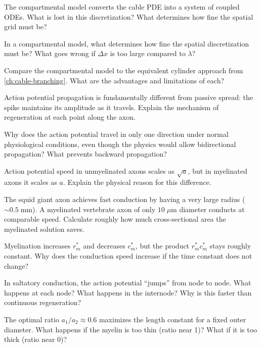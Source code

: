\begin{conceptquestions}
  \item The compartmental model converts the cable PDE into a system of coupled ODEs. What is lost in this discretization? What determines how fine the spatial grid must be?

  \item In a compartmental model, what determines how fine the spatial discretization must be? What goes wrong if $\Delta x$ is too large compared to $\lambda$?

  \item Compare the compartmental model to the equivalent cylinder approach from \cref{ch:cable-branching}. What are the advantages and limitations of each?

  \item Action potential propagation is fundamentally different from passive spread: the spike maintains its amplitude as it travels. Explain the mechanism of regeneration at each point along the axon.

  \item Why does the action potential travel in only one direction under normal physiological conditions, even though the physics would allow bidirectional propagation? What prevents backward propagation?

  \item Action potential speed in unmyelinated axons scales as $\sqrt{a}$, but in myelinated axons it scales as $a$. Explain the physical reason for this difference.

  \item The squid giant axon achieves fast conduction by having a very large radius ($\sim 0.5\;\text{mm}$). A myelinated vertebrate axon of only $10\;\mu\text{m}$ diameter conducts at comparable speed. Calculate roughly how much cross-sectional area the myelinated solution saves.

  \item Myelination increases $r_m^*$ and decreases $c_m^*$, but the product $r_m^* c_m^*$ stays roughly constant. Why does the conduction speed increase if the time constant does not change?

  \item In saltatory conduction, the action potential ``jumps'' from node to node. What happens at each node? What happens in the internode? Why is this faster than continuous regeneration?

  \item The optimal ratio $a_1/a_2 \approx 0.6$ maximizes the length constant for a fixed outer diameter. What happens if the myelin is too thin (ratio near 1)? What if it is too thick (ratio near 0)?


\end{conceptquestions}
